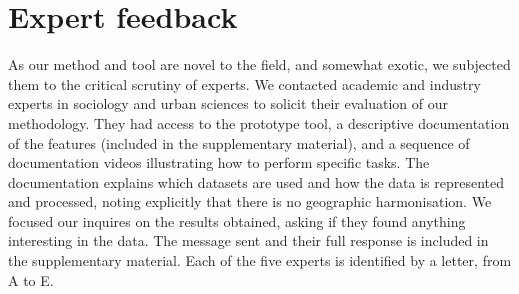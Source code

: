 







\section{Expert feedback}
\label{sec:expert}
As our method and tool are novel to the field, and somewhat exotic,  we
subjected them to the critical scrutiny of experts. We contacted academic and
industry experts in sociology and urban sciences to solicit their evaluation of
our methodology. They had access to the prototype tool, a descriptive
documentation of the features (included in the supplementary material), and a
sequence of documentation videos illustrating how to perform specific tasks. The
documentation explains which datasets are used and how the data is represented
and processed, noting explicitly that there is no geographic harmonisation. We
focused our inquires on the results obtained, asking if they found anything
interesting in the data. The message sent and their full response is included in
the supplementary material. Each of the five experts is identified by a letter,
from A to E. 



